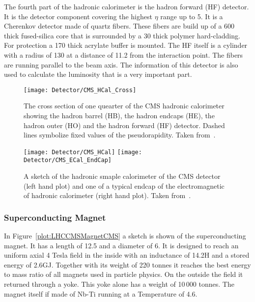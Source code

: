The fourth part of the hadronic calorimeter is the hadron forward (HF) detector. It is the detector component  covering the  highest $\eta{}$ range up to 5. It is a Cherenkov detector made of quartz fibers. These fibers are build up of a 600\mum{} thick fused-silica core that is surrounded by a 30\mum{} thick polymer hard-cladding. For protection a 170\mum{} thick acrylate buffer is mounted. The HF itself is a cylinder with a radius of 130\cm{} at a distance of 11.2\m{} from the interaction point. The fibers are running parallel to the beam axis. The information of this detector is also used to calculate the luminosity that is a very important part.

\begin{figure}[!Hhtb]
    \centering
    \texttt{[image: Detector/CMS\_HCal\_Cross]}
    \caption[Cross section of the CMS hadronic calorimeter]{The cross section of one quearter of the CMS hadronic calorimeter showing the hadron barrel (HB), the hadron endcaps (HE), the hadron outer (HO) and the hadron forward (HF) detector. Dashed lines symbolize fixed values of the pseudorapidity. Taken from~. \label{plot:LHCCMSHCalCross}}
\end{figure}

\begin{figure}[!Hhtb]
  \centering
  \texttt{[image: Detector/CMS\_HCal]}
  \texttt{[image: Detector/CMS\_ECal\_EndCap]}
  \caption[Sketches of the hadronic calorimeter of CMS]{A sketch of the hadronic smaple calorimeter of the CMS detector (left hand plot) and one of a typical endcap of the electromagnetic of hadronic calorimeter (right hand plot). Taken from~. \label{plot:LHCCMSHCalCMS}}
\end{figure}

\subsubsection{Superconducting Magnet}

In Figure~\ref{plot:LHCCMSMagnetCMS} a sketch is shown of the superconducting magnet. It has a length of 12.5\m{} and a diameter of 6\m{}. It is designed to reach an uniform axial 4 Tesla field in the inside with an inductance of 14.2\unit{H} and a stored energy of 2.6\unit{GJ}. Together with its weight of 220 tonnes it reaches the best energy to mass ratio of all magnets used in particle physics. On the outside the field it returned through a yoke. This yoke alone has a weight of 10\,000 tonnes. The magnet itself if made of Nb-Ti running at a Temperature of 4.6\K{}.

